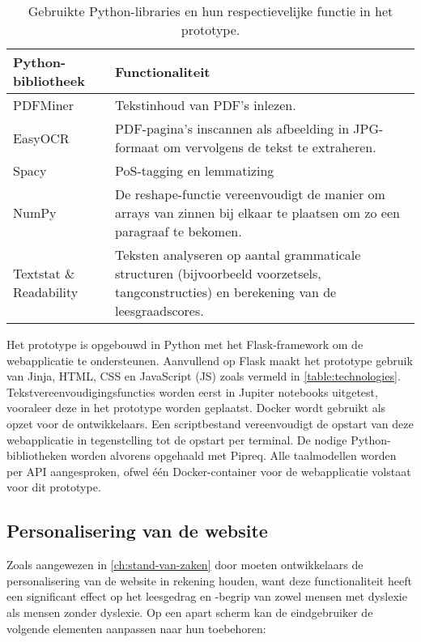 \begin{center}
	\begin{table}
	\begin{tabular}{ | m{4cm} | m{12cm} | } 
		\hline
		\textbf{Python-bibliotheek} & \textbf{Functionaliteit} \\
		\hline
		PDFMiner 				& Tekstinhoud van PDF's inlezen. \\ 
		EasyOCR					& PDF-pagina's inscannen als afbeelding in JPG-formaat om vervolgens de tekst te extraheren. \\
		Spacy 					& PoS-tagging en lemmatizing \\
		NumPy 					& De reshape-functie vereenvoudigt de manier om arrays van zinnen bij elkaar te plaatsen om zo een paragraaf te bekomen. \\
		Textstat \& Readability	& Teksten analyseren op aantal grammaticale structuren (bijvoorbeeld voorzetsels, tangconstructies) en berekening van de leesgraadscores. \\
		\hline
	\end{tabular}
	\label{table:python-libraries}
	\caption{Gebruikte Python-libraries en hun respectievelijke functie in het prototype.}
	\end{table}
\end{center}

Het prototype is opgebouwd in Python met het Flask-framework om de webapplicatie te ondersteunen. Aanvullend op Flask maakt het prototype gebruik van Jinja, HTML, CSS en JavaScript (JS) zoals vermeld in \ref{table:technologies}. Tekstvereenvoudigingsfuncties worden eerst in Jupiter notebooks uitgetest, vooraleer deze in het prototype worden geplaatst. Docker wordt gebruikt als opzet voor de ontwikkelaars. Een scriptbestand vereenvoudigt de opstart van deze webapplicatie in tegenstelling tot de opstart per terminal. De nodige Python-bibliotheken worden alvorens opgehaald met Pipreq. Alle taalmodellen worden per API aangesproken, ofwel één Docker-container voor de webapplicatie volstaat voor dit prototype.


\subsection{Personalisering van de website}


Zoals aangewezen in \ref{ch:stand-van-zaken} door \textcite{Harvard2023} moeten ontwikkelaars de personalisering van de website in rekening houden, want deze functionaliteit heeft een significant effect op het leesgedrag en -begrip van zowel mensen met dyslexie als mensen zonder dyslexie. Op een apart scherm kan de eindgebruiker de volgende elementen aanpassen naar hun toebehoren:

